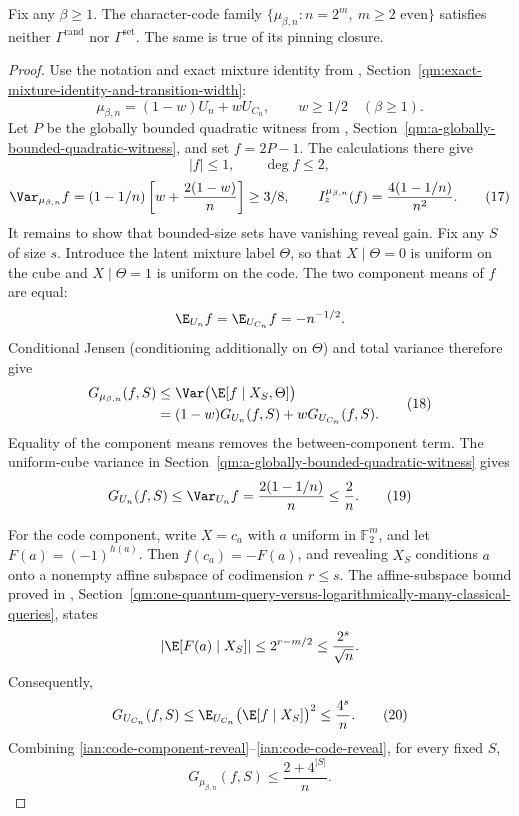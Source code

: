 \begin{proposition}
\label{ian:character-code-generalized-failure}
Fix any \(\beta\ge1\). The character-code family
\(\{\mu_{\beta,n}:n=2^m,\ m\ge2\text{ even}\}\) satisfies neither
\(\Gamma^{\mathrm{rand}}\) nor \(\Gamma^{\mathrm{set}}\).
The same is true of its pinning closure.
\end{proposition}

\begin{proof}
Use the notation and exact mixture identity from
,
Section~\ref{qm:exact-mixture-identity-and-transition-width}:
\[
 \mu_{\beta,n}=(1-w)U_n+wU_{C_n},\qquad w\ge1/2
 \quad(\beta\ge1).
\]
Let \(P\) be the globally bounded quadratic witness from
,
Section~\ref{qm:a-globally-bounded-quadratic-witness}, and set \(f=2P-1\).
The calculations there give
\[
 |f|\le1,\qquad \deg f\le2,
\]
\[
 \Var_{\mu_{\beta,n}}f
 =(1-1/n)\left[w+\frac{2(1-w)}n\right]\ge3/8,
 \qquad
 I_z^{\mu_{\beta,n}}(f)=\frac{4(1-1/n)}{n^2}.
 \tag{17}\label{ian:code-local-bound}
\]
It remains to show that bounded-size sets have vanishing reveal gain.
Fix any \(S\) of size \(s\). Introduce the latent mixture label
\(\Theta\), so that \(X\mid\Theta=0\) is uniform on the cube and
\(X\mid\Theta=1\) is uniform on the code. The two component means of
\(f\) are equal:
\[
 \E_{U_n}f=\E_{U_{C_n}}f=-n^{-1/2}.
\]
Conditional Jensen (conditioning additionally on \(\Theta\)) and total
variance therefore give
\[
 \begin{split}
 G_{\mu_{\beta,n}}(f,S)
 &\le\Var\bigl(\E[f\mid X_S,\Theta]\bigr)\\
 &=(1-w)G_{U_n}(f,S)+wG_{U_{C_n}}(f,S).
 \end{split}
 \tag{18}\label{ian:code-component-reveal}
\]
Equality of the component means removes the between-component term.
The uniform-cube variance in
Section~\ref{qm:a-globally-bounded-quadratic-witness} gives
\[
 G_{U_n}(f,S)\le\Var_{U_n}f
 =\frac{2(1-1/n)}n\le\frac2n.
 \tag{19}\label{ian:code-uniform-reveal}
\]

For the code component, write \(X=c_a\) with \(a\) uniform in
\(\mathbb F_2^m\), and let \(F(a)=(-1)^{h(a)}\).
Then \(f(c_a)=-F(a)\), and revealing \(X_S\) conditions \(a\) onto a
nonempty affine subspace of codimension \(r\le s\). The affine-subspace
bound proved in
,
Section~\ref{qm:one-quantum-query-versus-logarithmically-many-classical-queries},
states
\[
 \left|\E[F(a)\mid X_S]\right|
 \le2^{r-m/2}\le\frac{2^s}{\sqrt n}.
\]
Consequently,
\[
 G_{U_{C_n}}(f,S)
 \le\E_{U_{C_n}}\bigl(\E[f\mid X_S]\bigr)^2
 \le\frac{4^s}{n}.
 \tag{20}\label{ian:code-code-reveal}
\]
Combining
\eqref{ian:code-component-reveal}--\eqref{ian:code-code-reveal}, for
every fixed \(S\),
\[
 \boxed{\displaystyle
 G_{\mu_{\beta,n}}(f,S)\le\frac{2+4^{|S|}}n.}
 \tag{21}\label{ian:code-reveal-upper}
\]


\end{proof}
